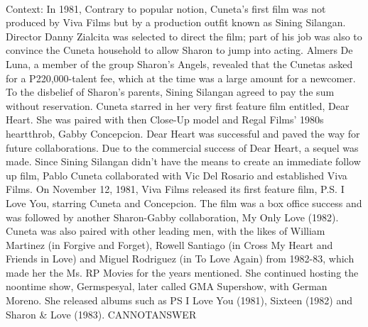 \documentclass[11pt,a4paper, onecolumn]{article}
\begin{document}
\\ Context: In 1981, Contrary to popular notion, Cuneta's first film was not produced by Viva Films but by a production outfit known as Sining Silangan. Director Danny Zialcita was selected to direct the film; part of his job was also to convince the Cuneta household to allow Sharon to jump into acting. Almers De Luna, a member of the group Sharon's Angels, revealed that the Cunetas asked for a P220,000-talent fee, which at the time was a large amount for a newcomer. To the disbelief of Sharon's parents, Sining Silangan agreed to pay the sum without reservation. Cuneta starred in her very first feature film entitled, Dear Heart. She was paired with then Close-Up model and Regal Films' 1980s heartthrob, Gabby Concepcion. Dear Heart was successful and paved the way for future collaborations. Due to the commercial success of Dear Heart, a sequel was made. Since Sining Silangan didn't have the means to create an immediate follow up film, Pablo Cuneta collaborated with Vic Del Rosario and established Viva Films. On November 12, 1981, Viva Films released its first feature film, P.S. I Love You, starring Cuneta and Concepcion. The film was a box office success and was followed by another Sharon-Gabby collaboration, My Only Love (1982). Cuneta was also paired with other leading men, with the likes of William Martinez (in Forgive and Forget), Rowell Santiago (in Cross My Heart and Friends in Love) and Miguel Rodriguez (in To Love Again) from 1982-83, which made her the Ms. RP Movies for the years mentioned. She continued hosting the noontime show, Germspesyal, later called GMA Supershow, with German Moreno. She released albums such as PS I Love You (1981), Sixteen (1982) and Sharon & Love (1983). CANNOTANSWER
\end{document}
